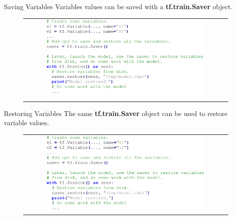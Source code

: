 \documentclass[aspectratio=169]{beamer}
\begin{document}
\begin{frame}{Saving Variables}
Variables values can be saved with a \textbf{tf.train.Saver} object.
\begin{figure}
\begin{tabular}{c}
\includegraphics[width=0.8\textwidth]{img/tf/save_variables.png}
\end{tabular}
\end{figure}
\end{frame}


\begin{frame}{Restoring Variables}
The same \textbf{tf.train.Saver} object can be used to restore variable values.
\begin{figure}
\begin{tabular}{c}
\includegraphics[width=0.8\textwidth]{img/tf/restore_variables.png}
\end{tabular}
\end{figure}
\end{frame}

\end{document}

